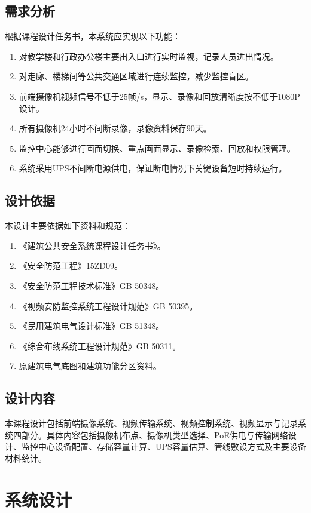 \documentclass[UTF8,zihao=-4,openany]{ctexrep}
\begin{document}
\section{需求分析}
根据课程设计任务书，本系统应实现以下功能：
\begin{enumerate}
  \item 对教学楼和行政办公楼主要出入口进行实时监视，记录人员进出情况。
  \item 对走廊、楼梯间等公共交通区域进行连续监控，减少监控盲区。
  \item 前端摄像机视频信号不低于25帧/s，显示、录像和回放清晰度按不低于1080P设计。
  \item 所有摄像机24小时不间断录像，录像资料保存90天。
  \item 监控中心能够进行画面切换、重点画面显示、录像检索、回放和权限管理。
  \item 系统采用UPS不间断电源供电，保证断电情况下关键设备短时持续运行。
\end{enumerate}

\section{设计依据}
本设计主要依据如下资料和规范：
\begin{enumerate}
  \item 《建筑公共安全系统课程设计任务书》。
  \item 《安全防范工程》15ZD09。
  \item 《安全防范工程技术标准》GB 50348。
  \item 《视频安防监控系统工程设计规范》GB 50395。
  \item 《民用建筑电气设计标准》GB 51348。
  \item 《综合布线系统工程设计规范》GB 50311。
  \item 原建筑电气底图和建筑功能分区资料。
\end{enumerate}

\section{设计内容}
本课程设计包括前端摄像系统、视频传输系统、视频控制系统、视频显示与记录系统四部分。具体内容包括摄像机布点、摄像机类型选择、PoE供电与传输网络设计、监控中心设备配置、存储容量计算、UPS容量估算、管线敷设方式及主要设备材料统计。

\chapter{系统设计}
\end{document}
